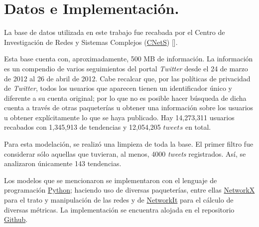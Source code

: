 \documentclass[../main.tex]{subfiles}
\begin{document}
\section{Datos e Implementación.}

La base de datos utilizada en este trabajo fue recabada por el Centro de Investigación de Redes y Sistemas Complejos (\href{https://cnets.indiana.edu/about/}{CNetS}) [\cite{D_Weng2013, D_weng2014predicting}].  


Esta base cuenta con, aproximadamente, 500 MB de información. La información es un compendio de varios seguimientos del portal \textit{Twitter} desde el 24 de marzo de 2012 al 26 de abril de 2012. Cabe recalcar que, por las políticas de privacidad de \textit{Twitter}, todos los usuarios que aparecen tienen un identificador único y diferente a su cuenta original; por lo que no es posible hacer búsqueda de dicha cuenta a través de otras paqueterías u obtener una información sobre los usuarios u obtener explícitamente lo que se haya publicado. Hay 14,273,311 usuarios recabados con 1,345,913 de tendencias y 12,054,205 $tweets$ en total.

Para esta modelación, se realizó una limpieza de toda la base. El primer filtro fue considerar sólo aquellas que tuvieran, al menos, 4000 \textit{tweets} registrados. Así, se analizaron únicamente 143 tendencias. 

Los modelos que se mencionaron se implementaron con el lenguaje de programación \href{https://www.python.org/}{Python}; haciendo uso de diversas paqueterías, entre ellas \href{https://networkx.org/}{NetworkX} para el trato y manipulación de las redes y de \href{https://networkit.github.io/}{NetworkIt} para el cálculo de diversas métricas. La implementación se encuentra alojada en el repositorio \href{https://github.com/ErickMM98/NetworkAnalysis_TwitterTrends}{Github}.
\end{document}
